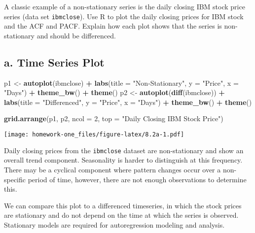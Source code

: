 \documentclass[openany]{book}
\newenvironment{Shaded}{\begin{snugshade}}{\end{snugshade}}
\newcommand{\DataTypeTok}[1]{\textcolor[rgb]{0.13,0.29,0.53}{#1}}
\newcommand{\DecValTok}[1]{\textcolor[rgb]{0.00,0.00,0.81}{#1}}
\newcommand{\KeywordTok}[1]{\textcolor[rgb]{0.13,0.29,0.53}{\textbf{#1}}}
\newcommand{\NormalTok}[1]{#1}
\newcommand{\OperatorTok}[1]{\textcolor[rgb]{0.81,0.36,0.00}{\textbf{#1}}}
\newcommand{\StringTok}[1]{\textcolor[rgb]{0.31,0.60,0.02}{#1}}
\begin{document}
A classic example of a non-stationary series is the daily closing IBM stock price series (data set \texttt{ibmclose}). Use R to plot the daily closing prices for IBM stock and the ACF and PACF. Explain how each plot shows that the series is non-stationary and should be differenced.

\hypertarget{a.-time-series-plot}{%
\subsection{a. Time Series Plot}\label{a.-time-series-plot}}

\begin{Shaded}
\begin{Highlighting}[]
\NormalTok{p1 <-}\StringTok{ }\KeywordTok{autoplot}\NormalTok{(ibmclose) }\OperatorTok{+}\StringTok{ }\KeywordTok{labs}\NormalTok{(}\DataTypeTok{title =} \StringTok{"Non-Stationary"}\NormalTok{, }
  \DataTypeTok{y =} \StringTok{"Price"}\NormalTok{, }\DataTypeTok{x =} \StringTok{"Days"}\NormalTok{) }\OperatorTok{+}\StringTok{ }\KeywordTok{theme_bw}\NormalTok{() }\OperatorTok{+}\StringTok{ }\KeywordTok{theme}\NormalTok{()}
\NormalTok{p2 <-}\StringTok{ }\KeywordTok{autoplot}\NormalTok{(}\KeywordTok{diff}\NormalTok{(ibmclose)) }\OperatorTok{+}\StringTok{ }\KeywordTok{labs}\NormalTok{(}\DataTypeTok{title =} \StringTok{"Differenced"}\NormalTok{, }
  \DataTypeTok{y =} \StringTok{"Price"}\NormalTok{, }\DataTypeTok{x =} \StringTok{"Days"}\NormalTok{) }\OperatorTok{+}\StringTok{ }\KeywordTok{theme_bw}\NormalTok{() }\OperatorTok{+}\StringTok{ }\KeywordTok{theme}\NormalTok{()}

\KeywordTok{grid.arrange}\NormalTok{(p1, p2, }\DataTypeTok{ncol =} \DecValTok{2}\NormalTok{, }\DataTypeTok{top =} \StringTok{"Daily Closing IBM Stock Price"}\NormalTok{)}
\end{Highlighting}
\end{Shaded}

\texttt{[image: homework-one\_files/figure-latex/8.2a-1.pdf]}

Daily closing prices from the \texttt{ibmclose} dataset are non-stationary and show an overall trend component. Seasonality is harder to distinguish at this frequency. There may be a cyclical component where pattern changes occur over a non-specific period of time, however, there are not enough observations to determine this.

We can compare this plot to a differenced timeseries, in which the stock prices are stationary and do not depend on the time at which the series is observed. Stationary models are required for autoregression modeling and analysis.
\end{document}
